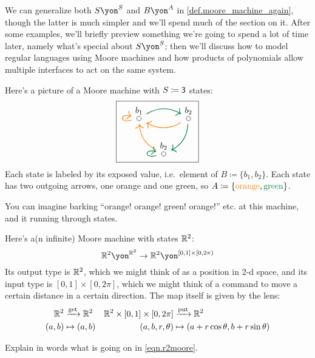 \documentclass[Book-Poly]{subfiles}
\begin{document}
We can generalize both $S\yon^S$ and $B\yon^A$ in \cref{def.moore_machine_again}, though the latter is much simpler and we'll spend much of the section on it. After some examples, we'll briefly preview something we're going to spend a lot of time later, namely what's special about $S\yon^S$; then we'll discuss how to model regular languages using Moore machines and how products of polynomials allow multiple interfaces to act on the same system.

\begin{example}\label{ex.Moore_three}
Here's a picture of a Moore machine with $S\coloneqq\textsf{3}$ states:
\[
\begin{tikzpicture}
	\node[draw] {
  \begin{tikzcd}[column sep=small]
  	\LMO{b_1}\ar[rr, dgreen, thick, bend left]\ar[loop left, thick, orange]&&
  	\LMO{b_2}\ar[ll, thick, orange, bend left]\ar[dl, bend left, thick, dgreen]\\&
  	\LMO{b_2} \ar[ul, thick, orange, bend left] \ar[loop left, thick, dgreen]
  \end{tikzcd}
  };
\end{tikzpicture}
\]
Each state is labeled by its exposed value, i.e.\ element of $B\coloneqq\{b_1,b_2\}$. Each state has two outgoing arrows, one orange and one green, so $A\coloneqq\{{\color{orange}\text{orange}},{\color{dgreen}\text{green}}\}$.

You can imagine barking ``orange! orange! green! orange!'' etc. at this machine, and it running through states.
\end{example}

\begin{example}\label{ex.R2_moore}
Here's a(n infinite) Moore machine with states $\mathbb{R}^2$:
\[
\rr^2\yon^{\rr^2}\to\rr^2\yon^{[0,1]\times[0,2\pi)}%
\]
Its output type is $\mathbb{R}^2$, which we might think of as a position in 2-d space, and its input type is $[0,1]\times[0,2\pi]$, which we might think of a command to move a certain distance in a certain direction. The map itself is given by the lens:
\begin{align}
  \mathbb{R}^2&\xrightarrow{\text{get}}\mathbb{R}^2&
  \mathbb{R}^2\times[0,1]\times[0,2\pi]&\xrightarrow{\text{put}}\mathbb{R}^2
  	\nonumber\\\label{eqn.r2moore}
  (a,b)&\mapsto(a,b)&
  (a,b,r,\theta)&\mapsto(a+r\cos\theta, b+r\sin\theta)
\end{align}
\end{example}

\begin{exercise}
Explain in words what is going on in \eqref{eqn.r2moore}.
\end{exercise}
\end{document}
